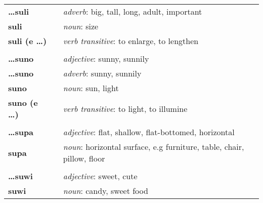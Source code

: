 \begin{supertabular}{p{2,5cm}|ll}
    \textbf{\dots suli}          &  & \textit{adverb}: big, tall, long, adult, important                                                         \\
    \textbf{suli}                &  & \textit{noun}: size                                                                                        \\
    \textbf{suli (e \dots)}      &  & \textit{verb transitive}: to enlarge, to lengthen                                                          \\
                                 &  &                                                                                                            \\ %
    \textbf{\dots suno}          &  & \textit{adjective}: sunny, sunnily                                                                         \\
    \textbf{\dots suno}          &  & \textit{adverb}: sunny, sunnily                                                                            \\
    \textbf{suno}                &  & \textit{noun}: sun, light                                                                                  \\
    \textbf{suno (e \dots)}      &  & \textit{verb transitive}: to light, to illumine                                                            \\
                                 &  &                                                                                                            \\ %
    \textbf{\dots supa}          &  & \textit{adjective}: flat, shallow, flat-bottomed, horizontal                                               \\
    \textbf{supa}                &  & \textit{noun}: horizontal surface, e.g furniture, table, chair, pillow, floor                              \\
                                 &  &                                                                                                            \\ %
    \textbf{\dots suwi}          &  & \textit{adjective}: sweet, cute                                                                            \\
    \textbf{suwi}                &  & \textit{noun}: candy, sweet food                                                                           \\

\end{supertabular}
